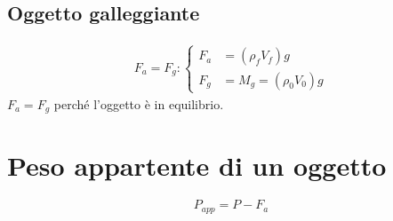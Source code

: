         \subsection*{Oggetto galleggiante}
            \begin{align}
                F_a = F_g :
                \begin{cases}
                    F_a &= (\rho_f V_f)g \\
                    F_g &= M_g = (\rho_0 V_0)g
                \end{cases}
            \end{align}
        $F_a = F_g$ perché l'oggetto è in equilibrio.

    \section*{Peso appartente di un oggetto}
        \begin{equation*}
            P_{app} = P - F_a
        \end{equation*}
            